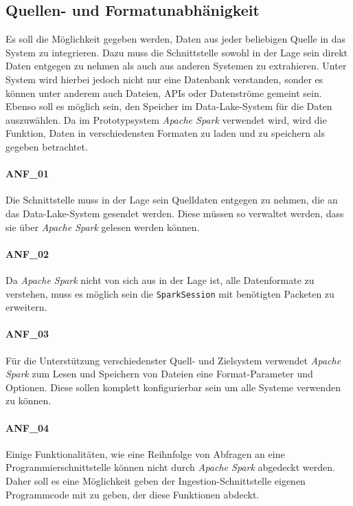 \subsection{Quellen- und Formatunabhänigkeit}
Es soll die Möglichkeit gegeben werden, Daten aus jeder beliebigen Quelle in das System zu integrieren.
Dazu muss die Schnittstelle sowohl in der Lage sein direkt Daten entgegen zu nehmen als auch aus anderen Systemen zu extrahieren.
Unter System wird hierbei jedoch nicht nur eine Datenbank verstanden, sonder es können unter anderem auch Dateien, APIs oder Datenströme gemeint sein.
Ebenso soll es möglich sein, den Speicher im Data-Lake-System für die Daten auszuwählen.
Da im Prototypsystem \textit{Apache Spark} verwendet wird, wird die Funktion, Daten in verschiedensten Formaten zu laden und zu speichern als gegeben betrachtet.

\paragraph{ANF\_01}
Die Schnittstelle muss in der Lage sein Quelldaten entgegen zu nehmen, die an das Data-Lake-System gesendet werden.
Diese müssen so verwaltet werden, dass sie über \textit{Apache Spark} gelesen werden können.

\paragraph{ANF\_02}
Da \textit{Apache Spark} nicht von sich aus in der Lage ist, alle Datenformate zu verstehen, muss es möglich sein die \verb|SparkSession| mit benötigten Packeten zu erweitern.

\paragraph{ANF\_03}
Für die Unterstützung verschiedenster Quell- und Zielsystem verwendet \textit{Apache Spark} zum Lesen und Speichern von Dateien eine Format-Parameter und Optionen.
Diese sollen komplett konfigurierbar sein um alle Systeme verwenden zu können.

\paragraph{ANF\_04}
Einige Funktionalitäten, wie eine Reihnfolge von Abfragen an eine Programmierschnittstelle können nicht durch \textit{Apache Spark} abgedeckt werden.
Daher soll es eine Möglichkeit geben der Ingestion-Schnittstelle eigenen Programmcode mit zu geben, der diese Funktionen abdeckt.